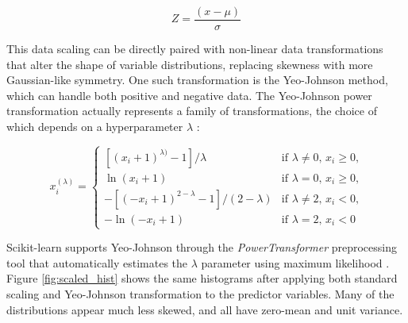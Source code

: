 \begin{equation}
    Z = \frac{(x - \mu)}{\sigma}
\end{equation}

This data scaling can be directly paired with non-linear data transformations that alter the shape of variable distributions, replacing skewness with more Gaussian-like symmetry. One such transformation is the Yeo-Johnson method, which can handle both positive and negative data. The Yeo-Johnson power transformation actually represents a family of transformations, the choice of which depends on a hyperparameter $\lambda$ \citep{yeo_new_2000}:

\begin{equation}
    x_i^{(\lambda)} = 
    \begin{cases}
      [(x_i + 1)^{\lambda)}-1]/\lambda & \text{if $\lambda \neq 0$, $x_i \geq 0$,}\\
      \ln{(x_i + 1)} & \text{if $\lambda = 0$, $x_i \geq 0$,}\\
      -[(-x_i + 1)^{2-\lambda}-1]/(2-\lambda) & \text{if $\lambda \neq 2$, $x_i < 0$,}\\
      -\ln{(-x_i + 1)} & \text{if $\lambda = 2$, $x_i < 0$}
    \end{cases}  
\end{equation}

Scikit-learn supports Yeo-Johnson through the \textit{PowerTransformer} preprocessing tool that automatically estimates the $\lambda$ parameter using maximum likelihood \citep{scikit-learn_sklearnpreprocessingpowertransformer_2021}. Figure \ref{fig:scaled_hist} shows the same histograms after applying both standard scaling and Yeo-Johnson transformation to the predictor variables. Many of the distributions appear much less skewed, and all have zero-mean and unit variance.


